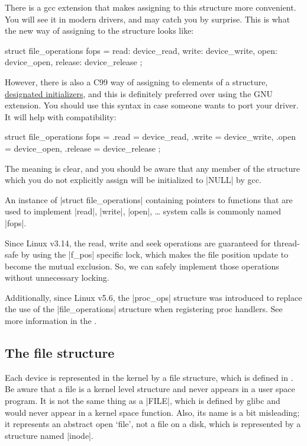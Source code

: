 \documentclass[10pt, oneside]{book}
\begin{document}
There is a gcc extension that makes assigning to this structure more convenient.
You will see it in modern drivers, and may catch you by surprise.
This is what the new way of assigning to the structure looks like:

\begin{code}
struct file_operations fops = {
	read: device_read,
	write: device_write,
	open: device_open,
	release: device_release
};
\end{code}

However, there is also a C99 way of assigning to elements of a structure, \href{https://gcc.gnu.org/onlinedocs/gcc/Designated-Inits.html}{designated initializers}, and this is definitely preferred over using the GNU extension.
You should use this syntax in case someone wants to port your driver.
It will help with compatibility:

\begin{code}
struct file_operations fops = {
	.read = device_read,
	.write = device_write,
	.open = device_open,
	.release = device_release
};
\end{code}

The meaning is clear, and you should be aware that any member of the structure which you do not explicitly assign will be initialized to \cpp|NULL| by gcc.

An instance of \cpp|struct file_operations| containing pointers to functions that are used to implement \cpp|read|, \cpp|write|, \cpp|open|, \ldots{} system calls is commonly named \cpp|fops|.

Since Linux v3.14, the read, write and seek operations are guaranteed for thread-safe by using the \cpp|f_pos| specific lock, which makes the file position update to become the mutual exclusion.
So, we can safely implement those operations without unnecessary locking.

Additionally, since Linux v5.6, the \cpp|proc_ops| structure was introduced to replace the use of the \cpp|file_operations| structure when registering proc handlers.
See more information in the .

\subsection{The file structure}
\label{sec:file_struct}

Each device is represented in the kernel by a file structure, which is defined in .
Be aware that a file is a kernel level structure and never appears in a user space program.
It is not the same thing as a \cpp|FILE|, which is defined by glibc and would never appear in a kernel space function.
Also, its name is a bit misleading; it represents an abstract open `file', not a file on a disk, which is represented by a structure named \cpp|inode|.
\end{document}
